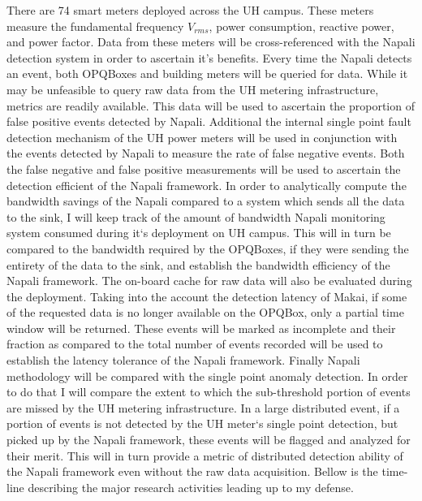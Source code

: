 There are 74 smart meters deployed across the UH campus. These meters measure the fundamental frequency $V_{rms}$, power consumption, reactive power, and power factor. Data from these meters will be cross-referenced with the Napali detection system in order to ascertain it's benefits. Every time the Napali detects an event, both OPQBoxes and building meters will be queried for data. While it may be unfeasible to query raw data from the UH metering infrastructure, metrics are readily available. This data will be used to ascertain the proportion of false positive events detected by Napali. Additional the internal single point fault detection mechanism of the UH power meters will be used in conjunction with the events detected by Napali to measure the rate of false negative events. Both the false negative and false positive measurements will be used to ascertain the detection efficient of the Napali framework. In order to analytically compute the bandwidth savings of the Napali compared to a system which sends all the data to the sink, I will keep track of the amount of bandwidth Napali monitoring system consumed during it`s deployment on UH campus. This will in turn be compared to the bandwidth required by the OPQBoxes, if they were sending the entirety of the data to the sink, and establish the bandwidth efficiency of the Napali framework. The on-board cache for raw data will also be evaluated during the deployment. Taking into the account the detection latency of Makai, if some of the requested data is no longer available on the OPQBox, only a partial time window will be returned. These events will be marked as incomplete and their fraction as compared to the total number of events recorded will be used to establish the latency tolerance of the Napali framework. Finally Napali methodology will be compared with the single point anomaly detection. In order to do that I will compare the extent to which the sub-threshold portion of events are missed by the UH metering infrastructure. In a large distributed event, if a portion of events is not detected by the UH meter`s single point detection, but picked up by the Napali framework, these events will be flagged and analyzed for their merit. This will in turn provide a metric of distributed detection ability of the Napali framework even without the raw data acquisition. Bellow is the time-line describing the major research activities leading up to my defense.


